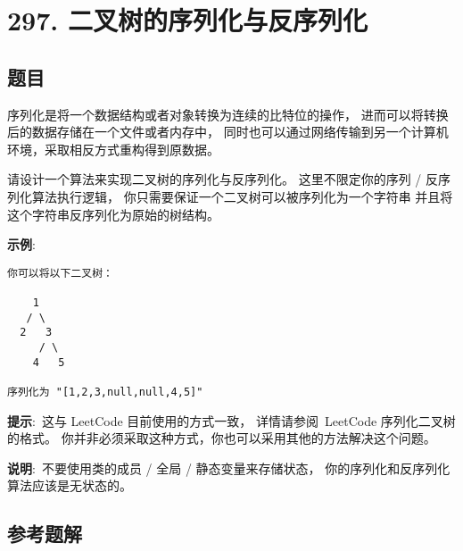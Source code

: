 \newpage
\section{297. 二叉树的序列化与反序列化}
\label{leetcode:297}

\subsection{题目}

序列化是将一个数据结构或者对象转换为连续的比特位的操作，
进而可以将转换后的数据存储在一个文件或者内存中，
同时也可以通过网络传输到另一个计算机环境，采取相反方式重构得到原数据。

请设计一个算法来实现二叉树的序列化与反序列化。
这里不限定你的序列 / 反序列化算法执行逻辑，
你只需要保证一个二叉树可以被序列化为一个字符串
并且将这个字符串反序列化为原始的树结构。

\textbf{示例}: 

\begin{verbatim}
你可以将以下二叉树：

    1
   / \
  2   3
     / \
    4   5

序列化为 "[1,2,3,null,null,4,5]"
\end{verbatim}

\textbf{提示}: 这与 LeetCode 目前使用的方式一致，
详情请参阅 LeetCode 序列化二叉树的格式。
你并非必须采取这种方式，你也可以采用其他的方法解决这个问题。

\textbf{说明}: 不要使用类的成员 / 全局 / 静态变量来存储状态，
你的序列化和反序列化算法应该是无状态的。

\subsection{参考题解}

